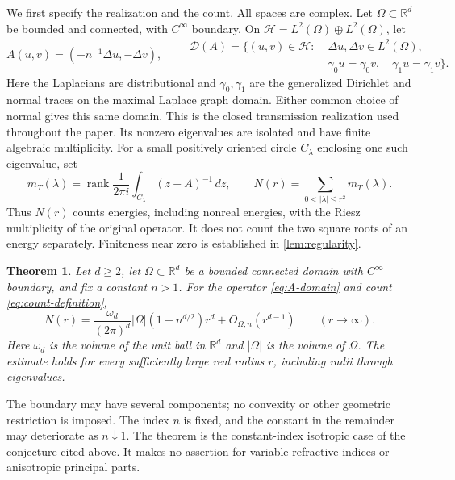\documentclass[11pt,a4paper]{article}
\newtheorem{theorem}{Theorem}[section]
\theoremstyle{remark}
\numberwithin{equation}{section}
\begin{document}
We first specify the realization and the count. All spaces are complex.
Let $\Omega\subset\mathbb R^d$ be bounded and connected, with
$C^\infty$ boundary. On $\mathcal H=L^2(\Omega)\oplus L^2(\Omega)$,
let
\begin{equation}\label{eq:A-domain}
 A(u,v)=(-n^{-1}\Delta u,-\Delta v),\qquad
 \begin{aligned}
 \mathcal D(A)=\{(u,v)\in\mathcal H:\;&\Delta u,\Delta v\in L^2(\Omega),\\
 &\gamma_0u=\gamma_0v,\quad\gamma_1u=\gamma_1v\}.
 \end{aligned}
\end{equation}
Here the Laplacians are distributional and $\gamma_0,\gamma_1$ are
the generalized Dirichlet and normal traces on the maximal Laplace
graph domain. Either common choice of normal gives this same domain.
This is the closed transmission realization used throughout the paper.
Its nonzero eigenvalues are isolated and have finite algebraic
multiplicity. For a small positively oriented circle $C_\lambda$
enclosing one such eigenvalue, set
\begin{equation}\label{eq:count-definition}
 m_T(\lambda)=\operatorname{rank}
 \frac{1}{2\pi i}\int_{C_\lambda}(z-A)^{-1}\,dz,
 \qquad
 N(r)=\sum_{0<|\lambda|\le r^2}m_T(\lambda).
\end{equation}
Thus $N(r)$ counts energies, including nonreal energies, with the Riesz
multiplicity of the original operator. It does not count the two square
roots of an energy separately. Finiteness near zero is established in
\cref{lem:regularity}.

\begin{theorem}\label{thm:main}
Let $d\ge2$, let $\Omega\subset\mathbb R^d$ be a bounded connected
domain with $C^\infty$ boundary, and fix a constant $n>1$.
For the operator \eqref{eq:A-domain} and count
\eqref{eq:count-definition},
\begin{equation}\label{eq:main}
 N(r)=\frac{\omega_d}{(2\pi)^d}|\Omega|(1+n^{d/2})r^d
       +O_{\Omega,n}(r^{d-1})\qquad(r\longrightarrow\infty).
\end{equation}
Here $\omega_d$ is the volume of the unit ball in $\mathbb R^d$ and
$|\Omega|$ is the volume of $\Omega$. The estimate holds for every
sufficiently large real radius $r$, including radii through
eigenvalues.
\end{theorem}

The boundary may have several components; no convexity or other
geometric restriction is imposed. The index $n$ is fixed, and the
constant in the remainder may deteriorate as $n\downarrow1$.
The theorem is the constant-index isotropic case of the conjecture
cited above. It makes no assertion for variable refractive indices or
anisotropic principal parts.
\end{document}
